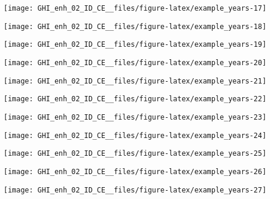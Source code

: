 \documentclass[
  10pt,
  a4paper,oneside]{article}
\begin{document}
\begin{center}\texttt{[image: GHI\_enh\_02\_ID\_CE\_\_files/figure-latex/example\_years-17]} \end{center}

\begin{center}\texttt{[image: GHI\_enh\_02\_ID\_CE\_\_files/figure-latex/example\_years-18]} \end{center}

\begin{center}\texttt{[image: GHI\_enh\_02\_ID\_CE\_\_files/figure-latex/example\_years-19]} \end{center}

\begin{center}\texttt{[image: GHI\_enh\_02\_ID\_CE\_\_files/figure-latex/example\_years-20]} \end{center}

\begin{center}\texttt{[image: GHI\_enh\_02\_ID\_CE\_\_files/figure-latex/example\_years-21]} \end{center}

\begin{center}\texttt{[image: GHI\_enh\_02\_ID\_CE\_\_files/figure-latex/example\_years-22]} \end{center}

\begin{center}\texttt{[image: GHI\_enh\_02\_ID\_CE\_\_files/figure-latex/example\_years-23]} \end{center}

\begin{center}\texttt{[image: GHI\_enh\_02\_ID\_CE\_\_files/figure-latex/example\_years-24]} \end{center}

\begin{center}\texttt{[image: GHI\_enh\_02\_ID\_CE\_\_files/figure-latex/example\_years-25]} \end{center}

\begin{center}\texttt{[image: GHI\_enh\_02\_ID\_CE\_\_files/figure-latex/example\_years-26]} \end{center}

\begin{center}\texttt{[image: GHI\_enh\_02\_ID\_CE\_\_files/figure-latex/example\_years-27]} \end{center}
\end{document}
